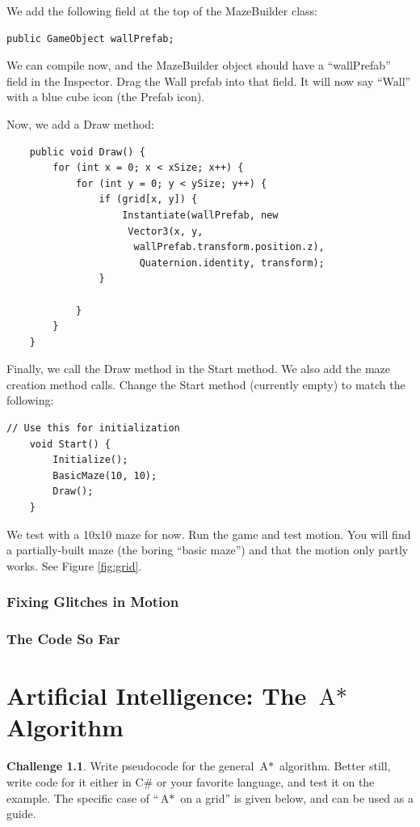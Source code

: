 \documentclass[12pt]{amsbook}
\theoremstyle{definition}
\newtheorem{challenge}[exercise]{Challenge}
\theoremstyle{remark}
\numberwithin{figure}{chapter}
\numberwithin{table}{chapter}
\numberwithin{section}{chapter}
\numberwithin{equation}{section}
\newcommand{\csharp}{\ensuremath{\mbox{C}\#}\xspace}
\newcommand{\astar}{\ensuremath{\mbox{A}*}\xspace}
\begin{document}
We add the following field at the top of the MazeBuilder class:
\begin{verbatim}
public GameObject wallPrefab;
\end{verbatim}

We can compile now, and the MazeBuilder object should have a ``wallPrefab'' field in the Inspector.  Drag the Wall prefab into that field.  It will now say ``Wall'' with a blue cube icon (the Prefab icon).

Now, we add a Draw method:
\begin{verbatim}
    public void Draw() {
        for (int x = 0; x < xSize; x++) {
            for (int y = 0; y < ySize; y++) {
                if (grid[x, y]) {
                    Instantiate(wallPrefab, new
                     Vector3(x, y,
                      wallPrefab.transform.position.z),
                       Quaternion.identity, transform);
                }

            }
        }
    }
\end{verbatim}

Finally, we call the Draw method  in the Start method.  We also add the maze creation method calls.  Change the Start method (currently empty) to match the following:

\begin{verbatim}
// Use this for initialization
    void Start() {
        Initialize();
        BasicMaze(10, 10);
        Draw();
    }
\end{verbatim}

We test with a 10x10 maze for now.  Run the game and test motion.  You will find a partially-built maze (the boring ``basic maze'') and that the motion only partly works.  See Figure \ref{fig:grid}.


\subsection{Fixing Glitches in Motion}

\subsection{The Code So Far}

\chapter[AI]{Artificial Intelligence: The \astar Algorithm}

\begin{challenge}
Write pseudocode for the general \astar algorithm.  Better still, write code for it either in \csharp or your favorite language, and test it on the example.  The specific case of ``\astar on a grid'' is given below, and can be used as a guide.
\end{challenge}
\end{document}
